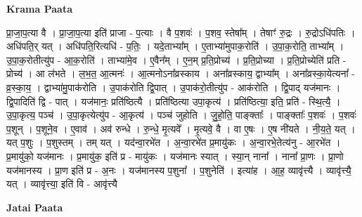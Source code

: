 \documentclass[17pt]{extarticle}
\begin{document}
\textbf{Krama Paata} \newline

प्रा॒जा॒प॒त्या वै । प्रा॒जा॒प॒त्या इति॑ प्राजा - प॒त्याः । वै प॒शवः॑ । प॒शव॒ स्तेषा᳚म् । तेषाꣳ॑ रु॒द्रः । रु॒द्रोऽधि॑पतिः । अधि॑पति॒र् यत् । अधि॑पति॒रित्यधि॑ - प॒तिः॒ । यदे॒ताभ्या᳚म् । ए॒ताभ्या॑मुपाक॒रोति॑ । उ॒पा॒क॒रोति॒ ताभ्या᳚म् । उ॒पा॒क॒रोतीत्यु॑प - आ॒क॒रोति॑ । ताभ्या॑मे॒व । ए॒वैन᳚म् । ए॒न॒म् प्र॒ति॒प्रोच्य॑ । प्र॒ति॒प्रोच्या । प्र॒ति॒प्रोच्येति॑ प्रति - प्रोच्य॑ । आ ल॑भते । ल॒भ॒त॒ आ॒त्मनः॑ । आ॒त्मनोऽना᳚व्रस्काय । अना᳚व्रस्काय॒ द्वाभ्या᳚म् । अना᳚व्रस्का॒येत्यना᳚ - व्र॒स्का॒य॒ । द्वाभ्या॑मु॒पाक॑रोति । उ॒पाक॑रोति द्वि॒पात् । उ॒पाक॑रो॒तीत्यु॑प - आक॑रोति । द्वि॒पाद् यज॑मानः । द्वि॒पादिति॑ द्वि - पात् । यज॑मानः॒ प्रति॑ष्ठित्यै । प्रति॑ष्ठित्या उपा॒कृत्य॑ । प्रति॑ष्ठित्या॒ इति॒ प्रति॑ - स्थि॒त्यै॒ । उ॒पा॒कृत्य॒ पञ्च॑ । उ॒पा॒कृत्येत्यु॑प - आ॒कृत्य॑ । पञ्च॑ जुहोति । जु॒हो॒ति॒ पाङ्क्ताः᳚ । पाङ्क्ताः᳚ प॒शवः॑ । प॒शवः॑ प॒शून् । प॒शूने॒व । ए॒वाव॑ । अव॑ रुन्धे । रु॒न्धे॒ मृ॒त्यवे᳚ । मृ॒त्यवे॒ वै । वा ए॒षः । ए॒ष नी॑यते । नी॒य॒ते॒ यत् । यत् प॒शुः । प॒शुस्तम् । तम् यत् । यद॑न्वा॒रभे॑त । अ॒न्वा॒रभे॑त प्र॒मायु॑कः । अ॒न्वा॒रभे॒तेत्य॑नु - आ॒रभे॑त । प्र॒मायु॑को॒ यज॑मानः । प्र॒मायु॑क॒ इति॑ प्र - मायु॑कः । यज॑मानः स्यात् । स्या॒न् नाना᳚ । नाना᳚ प्रा॒णः । प्रा॒णो यज॑मानस्य । प्रा॒ण इति॑ प्र - अ॒नः । यज॑मानस्य प॒शुना᳚ । प॒शुनेति॑ । इत्या॑ह । आ॒ह॒ व्यावृ॑त्त्यै । व्यावृ॑त्त्यै॒ यत् । व्यावृ॑त्त्या॒ इति॑ वि - आवृ॑त्त्यै \newline

\textbf{Jatai Paata} \newline
\end{document}

